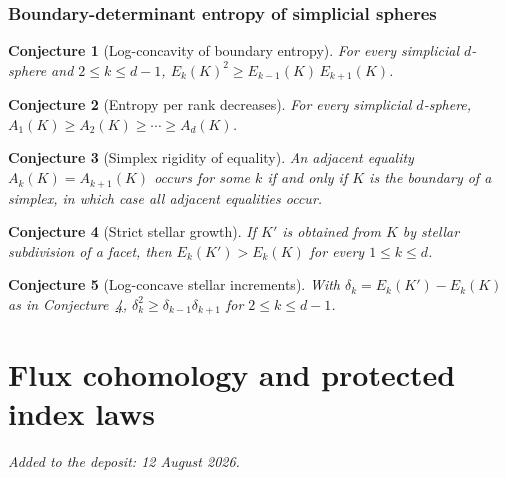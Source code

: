 \documentclass[11pt]{article}
\newtheorem{conjecture}{Conjecture}
\theoremstyle{definition}
\begin{document}
\section{Boundary-determinant entropy of simplicial spheres}

\begin{conjecture}[Log-concavity of boundary entropy]\label{z16}
For every simplicial $d$-sphere and $2\le k\le d-1$, $E_k(K)^2\ge E_{k-1}(K)\,E_{k+1}(K)$.
\end{conjecture}

\begin{conjecture}[Entropy per rank decreases]\label{z17}
For every simplicial $d$-sphere, $A_1(K)\ge A_2(K)\ge\cdots\ge A_d(K)$.
\end{conjecture}

\begin{conjecture}[Simplex rigidity of equality]\label{z18}
An adjacent equality $A_k(K)=A_{k+1}(K)$ occurs for some $k$ if and only if $K$ is the boundary of a simplex, in which case all adjacent equalities occur.
\end{conjecture}

\begin{conjecture}[Strict stellar growth]\label{z19}
If $K'$ is obtained from $K$ by stellar subdivision of a facet, then $E_k(K')>E_k(K)$ for every $1\le k\le d$.
\end{conjecture}

\begin{conjecture}[Log-concave stellar increments]\label{z20}
With $\delta_k=E_k(K')-E_k(K)$ as in Conjecture~\ref{z19}, $\delta_k^2\ge\delta_{k-1}\delta_{k+1}$ for $2\le k\le d-1$.
\end{conjecture}

\part{Flux cohomology and protected index laws}

\medskip\noindent\emph{Added to the deposit: 12 August 2026.}\par\medskip
\end{document}
